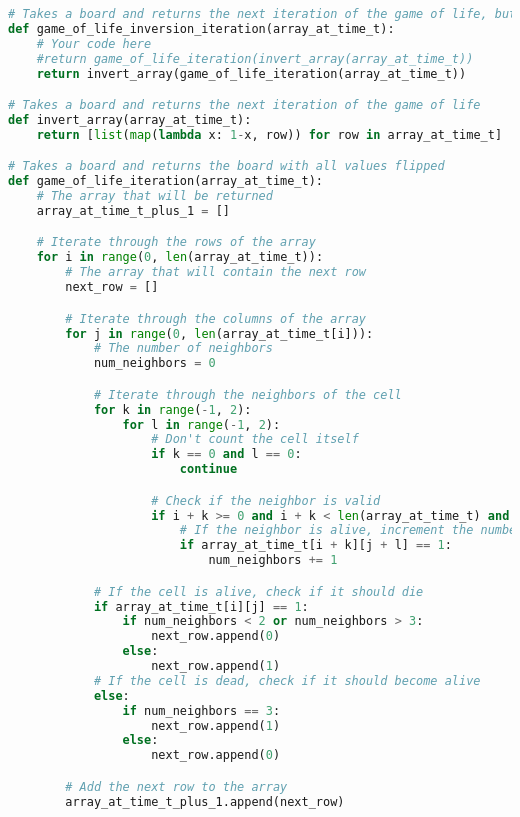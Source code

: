 \begin{figure*}[h]
\begin{lstlisting}[language=Python]
# Takes a board and returns the next iteration of the game of life, but with all values flipped
def game_of_life_inversion_iteration(array_at_time_t):
    # Your code here
    #return game_of_life_iteration(invert_array(array_at_time_t))
    return invert_array(game_of_life_iteration(array_at_time_t))

# Takes a board and returns the next iteration of the game of life
def invert_array(array_at_time_t):
    return [list(map(lambda x: 1-x, row)) for row in array_at_time_t]

# Takes a board and returns the board with all values flipped
def game_of_life_iteration(array_at_time_t):
    # The array that will be returned
    array_at_time_t_plus_1 = []

    # Iterate through the rows of the array
    for i in range(0, len(array_at_time_t)):
        # The array that will contain the next row
        next_row = []

        # Iterate through the columns of the array
        for j in range(0, len(array_at_time_t[i])):
            # The number of neighbors
            num_neighbors = 0

            # Iterate through the neighbors of the cell
            for k in range(-1, 2):
                for l in range(-1, 2):
                    # Don't count the cell itself
                    if k == 0 and l == 0:
                        continue

                    # Check if the neighbor is valid
                    if i + k >= 0 and i + k < len(array_at_time_t) and j + l >= 0 and j + l < len(array_at_time_t[i]):
                        # If the neighbor is alive, increment the number of neighbors
                        if array_at_time_t[i + k][j + l] == 1:
                            num_neighbors += 1

            # If the cell is alive, check if it should die
            if array_at_time_t[i][j] == 1:
                if num_neighbors < 2 or num_neighbors > 3:
                    next_row.append(0)
                else:
                    next_row.append(1)
            # If the cell is dead, check if it should become alive
            else:
                if num_neighbors == 3:
                    next_row.append(1)
                else:
                    next_row.append(0)

        # Add the next row to the array
        array_at_time_t_plus_1.append(next_row)


\end{lstlisting}
\end{figure*}
